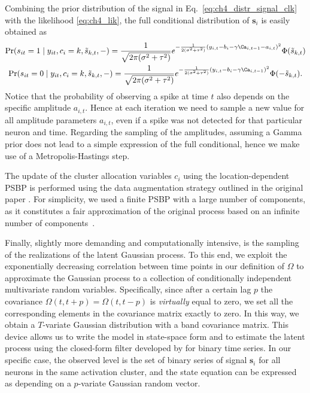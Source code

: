 Combining the prior distribution of the signal in Eq.~\eqref{eq:ch4_distr_signal_clk} with the likelihood \eqref{eq:ch4_lik}, the full conditional distribution of $\bm{s}_i$ is easily obtained as
\begin{gather*}
\Pr(s_{it} = 1 \mid y_{it}, c_i=k, \tilde{s}_{k,t}, -) = \frac{1}{\sqrt{2\pi(\sigma^2+\tau^2)}}e^{-\frac{1}{2(\sigma^2+\tau^2)}(y_{i,t} - b_i - \gamma \Ca_{i,t-1}- a_{i,t})^2 } \Phi(\tilde{s}_{k,t}) \\
%
\Pr(s_{it} = 0 \mid y_{it}, c_i=k, \tilde{s}_{k,t}, -) = \frac{1}{\sqrt{2\pi(\sigma^2+\tau^2)}}e^{-\frac{1}{2(\sigma^2+\tau^2)}(y_{i,t} - b_i - \gamma \Ca_{i,t-1})^2 } \Phi(-\tilde{s}_{k,t}).
\end{gather*}
Notice that the probability of observing a spike at time $t$ also depends on the specific amplitude $a_{i,t}$. Hence at each iteration we need to sample a new value for all amplitude parameters $a_{i,t}$, even if a spike was not detected for that particular neuron and time.
Regarding the sampling of the amplitudes, assuming a Gamma prior does not lead to a simple expression of the full conditional, hence we make use of a Metropolis-Hastings step.

The update of the cluster allocation variables $c_i$ using the location-dependent PSBP is performed using the data augmentation strategy outlined in the original paper \parencite{rodriguez2011}. For simplicity, we used a finite PSBP with a large number of components, as it constitutes a fair approximation of the original process based on an infinite number of components~\parencite{rodriguez2011, ishwaran2001}.

Finally, slightly more demanding and computationally intensive, is the sampling of the realizations of the latent Gaussian process. To this end, we exploit the exponentially decreasing correlation between time points in our definition of $\Omega$ to approximate the Gaussian process to a collection of conditionally independent multivariate random variables. Specifically, since after a certain lag $p$ the covariance $\Omega(t,t+p)=\Omega(t,t-p)$ is \textit{virtually} equal to zero, we set all the corresponding elements in the covariance matrix exactly to zero. In this way, we obtain a $T$-variate Gaussian distribution with a band covariance matrix. This device allows us to write the model in state-space form and to estimate the latent process using the closed-form filter developed by \textcite{fasano2021} for binary time series. In our specific case, the observed level is the set of binary series of signal $\bm{s}_i$ for all neurons in the same activation cluster, and the state equation can be expressed as depending on a $p$-variate Gaussian random vector.


